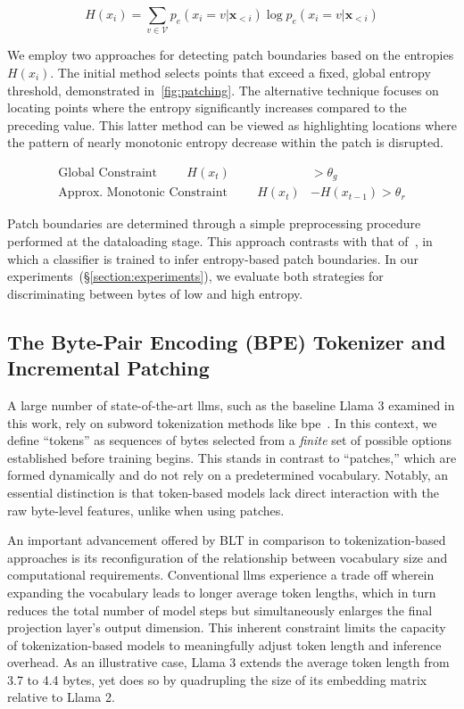 \begin{equation}
H(x_i) = \sum_{v \in \mathcal{V}} p_{e}(x_i=v|\pmb{x}_{<i}) \log p_{e}(x_i=v|\pmb{x}_{<i})
\end{equation}

We employ two approaches for detecting patch boundaries based on the entropies $H(x_i)$. The initial method selects points that exceed a fixed, global entropy threshold, demonstrated in~\autoref{fig:patching}. The alternative technique focuses on locating points where the entropy significantly increases compared to the preceding value. This latter method can be viewed as highlighting locations where the pattern of nearly monotonic entropy decrease within the patch is disrupted.

\begin{align*}
    \text{Global Constraint}\hspace{1cm}H(x_t)& > \theta_g\\
    \text{Approx. Monotonic Constraint}\hspace{1cm}H(x_t)& - H(x_{t-1}) > \theta_r
\end{align*}

Patch boundaries are determined through a simple preprocessing procedure performed at the dataloading stage. This approach contrasts with that of~\citet{nawrot-etal-2023-efficient}, in which a classifier is trained to infer entropy-based patch boundaries. In our experiments~(\S\ref{section:experiments}), we evaluate both strategies for discriminating between bytes of low and high entropy.

\subsection{The Byte-Pair Encoding (BPE) Tokenizer and Incremental Patching}
\label{section:incremental-patching}
\label{section:bpe-patch}

A large number of state-of-the-art llms, such as the baseline Llama 3 examined in this work, rely on subword tokenization methods like bpe~\citep{gage1994new, sennrich-etal-2016-neural}. In this context, we define ``tokens'' as sequences of bytes selected from a \textit{finite} set of possible options established before training begins. This stands in contrast to ``patches,'' which are formed dynamically and do not rely on a predetermined vocabulary. Notably, an essential distinction is that token-based models lack direct interaction with the raw byte-level features, unlike when using patches.

An important advancement offered by {\textsc BLT} in comparison to tokenization-based approaches is its reconfiguration of the relationship between vocabulary size and computational requirements. Conventional llms experience a trade off wherein expanding the vocabulary leads to longer average token lengths, which in turn reduces the total number of model steps but simultaneously enlarges the final projection layer's output dimension. This inherent constraint limits the capacity of tokenization-based models to meaningfully adjust token length and inference overhead. As an illustrative case, Llama 3 extends the average token length from 3.7 to 4.4 bytes, yet does so by quadrupling the size of its embedding matrix relative to Llama 2.

